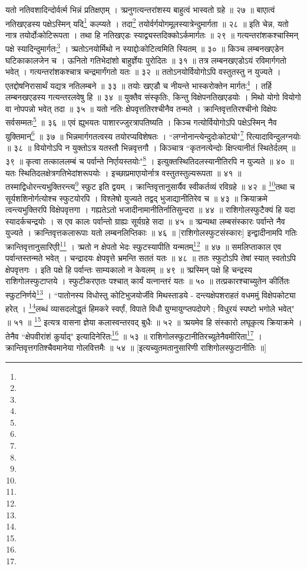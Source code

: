 यतो नतिवशादिन्दोर्वर्त्म भिन्नं प्रतिक्षएाम् ।
त्र्प्रनुगत्यन्तरांशस्य बाहुत्वं भास्वतो ग्रहे ॥ २७ ॥
बाएात्वं नतिखएडस्य पक्षेऽस्मिन् यदि\footnote{} कल्प्यते ।
तदा\footnote{} तयोर्वर्गयोगमूलस्यात्रेन्दुमार्गता ॥ २८ ॥
इति चेन्न, यतो नात्र तयोर्दोःकोटिरूपता ।
तथा हि नतिखएडः स्याद्व्यस्तदिक्कोऽर्कमार्गतः ॥ २९ ॥
गत्यन्तरांशकश्चास्मिन् पक्षे स्यादिन्दुमार्गतः\footnote{} ।
त्र्प्रतोऽनयोर्मिथो न स्याद्दोःकोटित्वमिति स्यितम् ॥ ३० ॥
किञ्च लम्बनखएडेन घटिकाकालजेन च ।
ऊनितो गतिभेदांशो बाहुर्ज्ञेयः पुरोदितः ॥ ३१ ॥
तत्र लम्बनखएडोऽयं रविमार्गगतो भवेत् । 
गत्यन्तरांशकश्चात्र चन्द्रमार्गंगतो यतः ॥ ३२ ॥
ततोऽनयोर्वियोगोऽपि वस्तुतस्तु न युज्यते ।
एतद्दोषनिरासार्थं यद्यत्र नतिलम्बने ॥ ३३ ॥
तयोः खएडौ च नीयन्ते भास्करोक्तेन मार्गतः\footnote{} ।
तर्हि लम्बनखएडस्य गत्यन्तरलवेषु हि ॥ ३४ ॥
युक्तैव संस्कृतिः, किन्तु विक्षेपनतिखएडयोः ।
मिथो योगो वियोगो वा नोपपन्नो भवेत् तदा ॥ ३५ ॥ 
यतो नतिः क्षेपवृत्ततिरश्चीनैव तन्मते ।
क्रान्तिवृत्ततिरश्चीनो विक्षेपः सर्वसम्मतः\footnote{} ॥ ३६ ॥
एवं ह्युभयतः पाशारज्जुरत्रापतिष्यति ।
किञ्च गत्योर्वियोगोऽपि पक्षेऽस्मिन् नैव युक्तिमान्\footnote{} ॥ ३७ ॥
भिन्नमार्गगतत्वस्य तयोरप्यविशेषतः ।
``लग्नोनान्त्येन्दुदोःकोट्यो"\footnote{} रित्यादाविन्दुलग्नयोः ॥ ३८ ॥
वियोगोऽपि न युक्तोऽत्र यतस्तौ भिन्नवृत्तगौ ।
किञ्चात्र ``कृतनत्येन्दोः क्षिप्त्यानीतं स्थितेर्दलम् ॥ ३९ ॥
कृत्वा तत्काललम्बं च पर्वान्ते निर्एायस्तयोः"\footnote{} ।
इत्युक्तस्थितिदलस्यानीतिरपि न युज्यते ॥ ४० ॥
यतः स्थितिदलक्षेत्रगतिभेदांशरूपयोः ।
इच्छाप्रमाएायोर्नात्र वस्तुतस्तुल्यरूपता ॥ ४१ ॥
तस्माद्विधोरन्त्यभुक्तिरन्त्य\footnote{} स्फुट इति द्वयम् ।
क्रान्तिवृत्तानुसार्यैव स्वीकर्तव्यं रविग्रहे ॥ ४२ ॥
\footnote{}तथा च सूर्यशशिनोर्गत्योश्च स्फुटयोरपि ।
विश्लेषो युज्यते तद्वद् भुजाद्यानीतिरेव च ॥ ४३ ॥
क्रियाक्रमे त्वन्त्यभुक्तिरपि विक्षेपवृत्तगा ।
गह्यतेऽतो भजादीनामानीतिर्नातिसुन्दरा ॥ ४४ ॥
राशिगोलस्फुटैक्यं हि यदा स्यादर्कचन्द्रयोः ।
स एव कालः पर्वान्तो ग्राह्यः सूर्यग्रहे सदा ॥ ४५ ॥
त्र्प्रन्यथा लम्बसंस्कारः पर्वान्ते नैव युज्यते ।
क्रान्तिवृत्तकलारूपाः यतो लम्बनलिप्तिकाः ॥ ४६ ॥
[राशिगोलस्फुटसंस्कारः]
इन्द्वादीनामपि गतिः क्रान्तिवृत्तानुसारिएाी\footnote{} ।
त्र्प्रतो न क्षेपतो भेदः स्फुटस्यापीति यन्मतम्\footnote{} ॥ ४७ ॥
समलिप्ताकाल एव पर्वान्तस्तन्मते भवेत् ।
चन्द्रादयः क्षेपवृत्ते भ्रमन्ति सततं यतः ॥ ४८ ॥
ततः स्फुटोऽपि तेषां स्यात् स्वतोऽपि क्षेपवृत्तगः ।
इति पक्षे हि पर्वान्तः साम्यकालो न केवलम् ॥ ४९ ॥
त्र्प्रस्मिन् पक्षे हि चन्द्रस्य राशिगोलस्फुटाप्तये ।
स्फुटीकरएातः पश्चात् कार्यं यत्नान्तरं यतः ॥ ५० ॥
तत्प्रकारश्चाच्युतेन कीर्तितः स्फुटनिर्णये\footnote{} ।
``पातोनस्य विधोस्तु कोटिभुजयोर्जीवे मिथस्ताडये -
दन्त्यक्षेपशराहतं वधममुं विक्षेपकोट्या हरेत् ।
\footnote{}लब्धं व्यासदलोद्धृतं हिमकरे स्वर्एां, विपाते विधौ 
युग्मायुग्प्तपदोपगे ; विधुरयं स्पष्टो भगोले भवेत्" ॥ ५१ ॥
\footnote{} इत्यत्र वासना ज्ञेया कलास्वन्तरवद् बुधैः ॥ ५२ ॥
त्र्प्रयमेव हि संस्कारो लघूकृत्य क्रियाक्रमे ।
तेनैव ``क्षेपवीरांशं कुर्याद्" इत्यादिनेरितः\footnote{} ॥ ५३ ॥
राशिगोलस्फुटानीतिरच्युतेनैवमीरिता\footnote{} ।
क्रान्तिवृत्तगतिश्चैवमानेया गोलवित्तमैः ॥ ५४ ॥
[इत्यच्युतमतानुसारिणी राशिगोलस्फुटानीतिः ॥]

